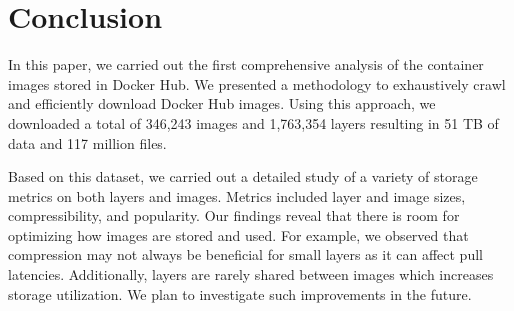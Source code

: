 \section{Conclusion}
\label{sec:conclusion}

In this paper, we carried out the first comprehensive analysis of the container images
stored in Docker Hub.
%
We presented a methodology to exhaustively crawl and efficiently download Docker Hub
images. Using this approach, we downloaded a total of 346,243 images and 1,763,354 layers
resulting in 51 TB of data and
117 million files.

Based on this dataset, we carried out a detailed study of a variety of storage
metrics on both layers and images. Metrics included layer and image sizes, compressibility,
and popularity. Our findings reveal that there is room for optimizing how images
are stored and used. For example, we observed that compression may not always be beneficial for small
layers as it can affect pull latencies. Additionally, layers are rarely shared between
images which increases storage utilization. We plan to investigate such improvements
in the future.

%
%
